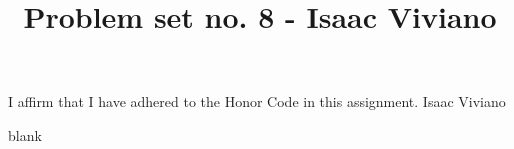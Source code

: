 \documentclass[12pt, reqno]{amsart}
\theoremstyle{definition}
\theoremstyle{remark}
\begin{document}
\title[Math 357 - Harmonic Analysis]{Problem set no. 8 - Isaac Viviano}

\begin{titlepage}
    
\maketitle

I affirm that I have adhered to the Honor Code in this assignment. Isaac Viviano

\end{titlepage}

blank
\newpage


\section*{}






\end{document}
